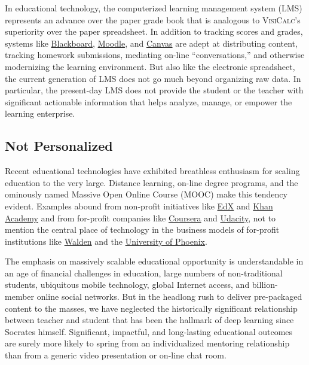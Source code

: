 \documentclass{article}
\newcommand{\vcalc}{\textsc{VisiCalc}}
\begin{document}
In educational technology,
the computerized learning management system (LMS)
represents an advance over the paper grade book
that is analogous to \vcalc{}'s superiority over the paper spreadsheet.
In addition to tracking scores and grades,
systems like
\href{https://www.blackboard.com/}{Blackboard},
\href{https://moodle.org/}{Moodle},
and
\href{https://www.instructure.com/canvas/}{Canvas}
are adept at distributing content,
tracking homework submissions,
mediating on-line ``conversations,''
and otherwise modernizing the learning environment.
But also like the electronic spreadsheet,
the current generation of LMS
does not go much beyond organizing raw data.
In particular,
the present-day LMS
does not provide the student or the teacher
with significant actionable information
that helps analyze, manage, or empower the learning enterprise.

\subsection{Not Personalized}
\label{sec:not-personalized}

Recent educational technologies
have exhibited breathless enthusiasm
for scaling education to the very large.
Distance learning,
on-line degree programs,
and the ominously named Massive Open Online Course (MOOC)
make this tendency evident.
Examples abound from non-profit initiatives like
\href{https://www.edx.org/}{EdX} and
\href{https://www.khanacademy.org/}{Khan Academy}
and from for-profit companies like
\href{https://www.coursera.org/}{Coursera}
and
\href{https://www.udacity.com/}{Udacity},
not to mention the central place of technology
in the business models of for-profit institutions
like
\href{https://waldenu.edu/}{Walden} and the
\href{https://www.phoenix.edu/}{University of Phoenix}.

The emphasis on massively scalable educational opportunity
is understandable in an age of financial challenges in education,
large numbers of non-tradi\-tional students,
ubiquitous mobile technology,
global Internet access,
and billion-member online social networks.
But in the headlong rush
to deliver pre-packaged content to the masses,
we have neglected the historically significant relationship
between teacher and student
that has been the hallmark of deep learning since Socrates himself.
Significant, impactful, and long-lasting educational outcomes
are surely more likely to spring
from an individualized mentoring relationship
than from a generic video presentation or on-line chat room.
\end{document}
